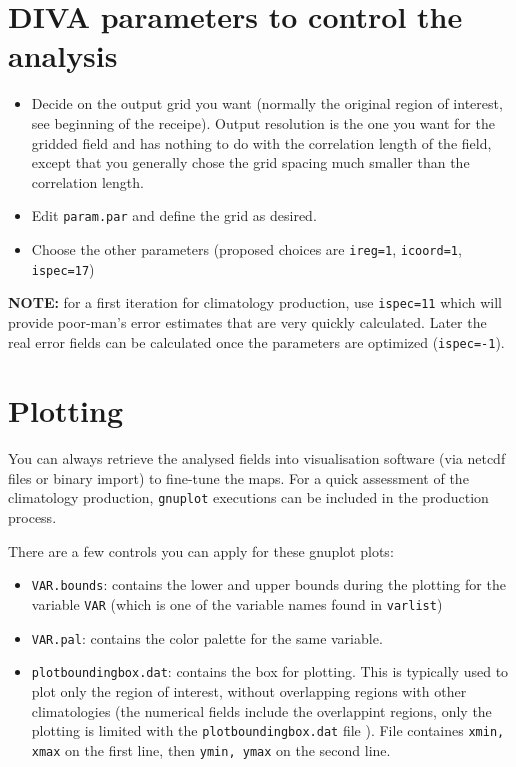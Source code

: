\documentclass[8pt,a4paper,notitlepage]{book}
\newcommand{\diva}{DIVA}
\begin{document}

\section{\diva {  } parameters to control the analysis}
\begin{itemize}
\item
Decide on the output grid you want (normally the original region of interest, see beginning of the receipe). Output resolution is the one you want for the gridded field and has nothing to do with the correlation length of the field, except that you generally chose the grid spacing much smaller than the correlation length.
\item Edit {\tt param.par} and define the grid as desired.
\item Choose the other parameters (proposed choices are {\tt ireg=1}, {\tt icoord=1}, {\tt ispec=17})
\end{itemize}

{\bf NOTE:} for a first iteration for climatology production, use {\tt ispec=11} which will provide poor-man's error estimates that are very quickly calculated. Later the real error fields 
can be calculated once the parameters are optimized ({\tt ispec=-1}).


\section{Plotting}
You can always retrieve the analysed fields into visualisation software (via netcdf files or binary import) to fine-tune the maps. For a quick assessment of the climatology production, {\tt gnuplot} executions can be included in the production process. 

There are a few controls you can apply for these gnuplot plots:
\begin{itemize}
\item {\tt VAR.bounds}: contains the lower and upper bounds during the plotting for the variable {\tt VAR} (which is one of the variable names found in {\tt varlist}) 
\item {\tt VAR.pal}: contains the color palette for the same variable.
\item {\tt plotboundingbox.dat}: contains the box for plotting. This is typically used to plot only the region of interest, without overlapping regions
with other climatologies (the numerical fields include the overlappint regions, only the plotting is limited with the {\tt plotboundingbox.dat} file ).
File containes {\tt xmin, xmax} on the first line, then {\tt ymin, ymax} on the second line.
\end{itemize}
\end{document}
